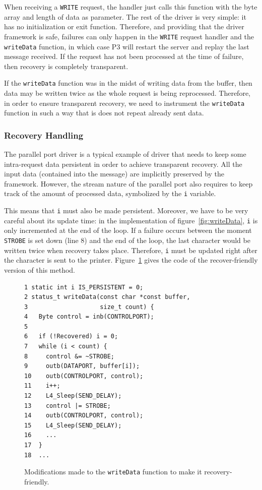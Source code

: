 \documentclass{acm_proc_article-sp}
\begin{document}
When receiving a \texttt{WRITE} request, the handler just calls this function with the byte array and length of data as parameter. The rest of the driver is very simple: it has no initialization or exit function. Therefore, and providing that the driver framework is safe, failures can only happen in the \texttt{WRITE} request handler and the \texttt{writeData} function, in which case P3 will restart the server and replay the last message received. If the request has not been processed at the time of failure, then recovery is completely transparent.

If the \texttt{writeData} function was in the midst of writing data from the buffer, then data may be written twice as the whole request is being reprocessed. Therefore, in order to ensure transparent recovery, we need to instrument the \texttt{writeData} function in such a way that is does not repeat already sent data.

\subsubsection{Recovery Handling}
The parallel port driver is a typical example of driver that needs to keep some intra-request data persistent in order to achieve transparent recovery. All the input data (contained into the message) are implicitly preserved by the framework. However, the stream nature of the parallel port also requires to keep track of the amount of processed data, symbolized by the \texttt{i} variable.

This means that \texttt{i} must also be made persistent. Moreover, we have to be very careful about its update time: in the implementation of figure~\ref{fig:writeData}, \texttt{i} is only incremented at the end of the loop. If a failure occurs between the moment \texttt{STROBE} is set down (line 8) and the end of the loop, the last character would be written twice when recovery takes place. Therefore, \texttt{i} must be updated right after the character is sent to the printer. Figure~\ref{fig:writeDataRecover} gives the code of the recover-friendly version of this method.

\begin{figure}[]
\centering
\begin{screen}
\begin{verbatim}
1 static int i IS_PERSISTENT = 0;
2 status_t writeData(const char *const buffer,
3                    size_t count) {
4   Byte control = inb(CONTROLPORT);
5
6   if (!Recovered) i = 0;
7   while (i < count) {
8     control &= ~STROBE;
9     outb(DATAPORT, buffer[i]);
10    outb(CONTROLPORT, control);
11    i++;
12    L4_Sleep(SEND_DELAY);
13    control |= STROBE;
14    outb(CONTROLPORT, control);
15    L4_Sleep(SEND_DELAY);
16    ...
17  }
18  ...
\end{verbatim}
\end{screen}
\caption{Modifications made to the \texttt{writeData} function to make it recovery-friendly.}
\label{fig:writeDataRecover}
\end{figure}
\end{document}
